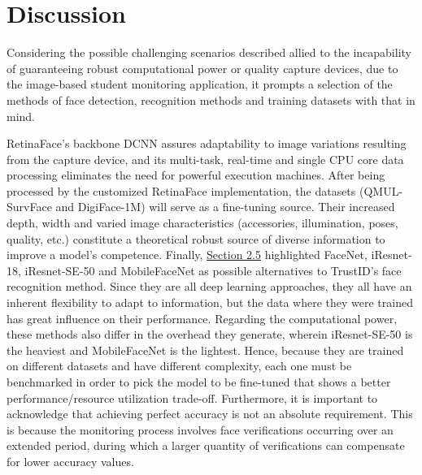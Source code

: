 \documentclass[class=report, crop=false, a4paper, 12pt]{standalone}
\begin{document}
\section{Discussion}\label{sec:methodology_discussion}
\par Considering the possible challenging scenarios described allied to the incapability of guaranteeing robust computational power or quality capture devices, due to the image-based student monitoring application, it prompts a selection of the methods of face detection, recognition methods and training datasets with that in mind. 
\par RetinaFace's backbone DCNN assures adaptability to image variations resulting from the capture device, and its multi-task, real-time and single CPU core data processing eliminates the need for powerful execution machines. After being processed by the customized RetinaFace implementation, the datasets (QMUL-SurvFace and DigiFace-1M) will serve as a fine-tuning source. Their increased depth, width and varied image characteristics (accessories, illumination, poses, quality, etc.) constitute a theoretical robust source of diverse information to improve a model's competence. Finally, \hyperref[sec:related_work]{Section 2.5} highlighted FaceNet, iResnet-18, iResnet-SE-50 and MobileFaceNet as possible alternatives to TrustID's face recognition method. Since they are all deep learning approaches, they all have an inherent flexibility to adapt to information, but the data where they were trained has great influence on their performance. Regarding the computational power, these methods also differ in the overhead they generate, wherein iResnet-SE-50 is the heaviest and MobileFaceNet is the lightest. Hence, because they are trained on different datasets and have different complexity, each one must be benchmarked in order to pick the model to be fine-tuned that shows a better performance/resource utilization trade-off. Furthermore, it is important to acknowledge that achieving perfect accuracy is not an absolute requirement. This is because the monitoring process involves face verifications occurring over an extended period, during which a larger quantity of verifications can compensate for lower accuracy values.
\end{document}
